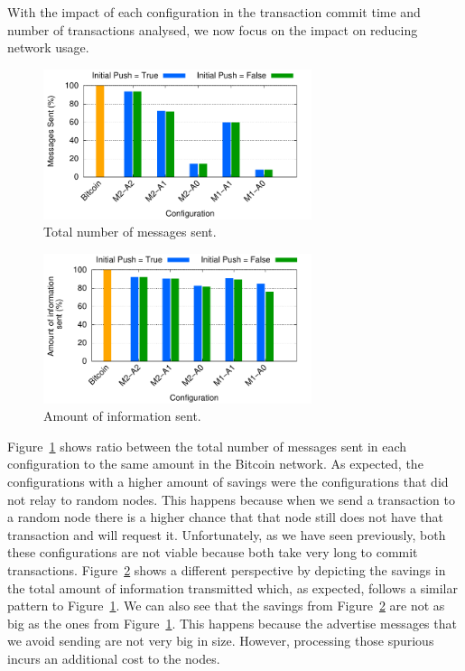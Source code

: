 With the impact of each configuration in the transaction commit time and number of transactions analysed, we now focus on the impact on reducing network usage.

\begin{figure}[h]
\centering
\includegraphics[width=0.7\textwidth]{plots/msg-sent.pdf}
\caption{Total number of messages sent.}
\label{fig:msg-sent}
\end{figure}

\begin{figure}[h]
\centering
\includegraphics[width=0.7\textwidth]{plots/mb-sent.pdf}
\caption{Amount of information sent.}
\label{fig:mb-sent}
\end{figure}

Figure~\ref{fig:msg-sent} shows ratio between the total number of messages sent in each configuration to the same amount in the Bitcoin network. As expected, the configurations with a higher amount of savings were the configurations that did not relay to random nodes. This happens because when we send a transaction to a random node there is a higher chance that that node still does not have that transaction and will request it. Unfortunately, as we have seen previously, both these configurations are not viable because both take very long to commit transactions. Figure~\ref{fig:mb-sent} shows a different perspective by depicting the savings in the total amount of information transmitted which, as expected, follows a similar pattern to Figure~\ref{fig:msg-sent}. We can also see that the savings from Figure~\ref{fig:mb-sent} are not as big as the ones from Figure~\ref{fig:msg-sent}.
This happens because the advertise messages that we avoid sending are not very big in size. However, processing those spurious incurs an additional cost to the nodes.

